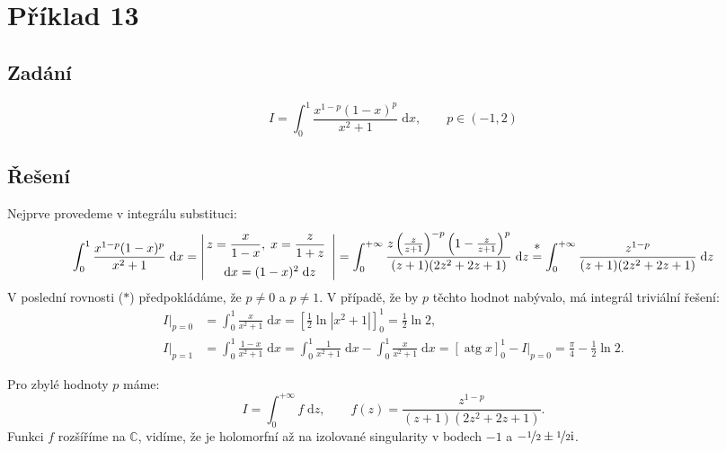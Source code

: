 \documentclass[10pt,a4paper]{article}
\newcommand{\const}[1]{\text{#1}}
\newcommand{\atg}{\operatorname{atg}}
\renewcommand{\d}[1]{\;\const{d}#1}
\renewcommand{\i}{\const{i}}
\begin{document}
\section{Příklad 13}
\subsection{Zadání}
\begin{equation*}
    I = \int_0^1 \frac{x^{1-p} (1-x)^p}{x^2+1} \d{x},
    \hspace{2em}
    p \in (-1, 2)
\end{equation*}

\subsection{Řešení}
Nejprve provedeme v integrálu substituci:
\begin{equation*}
    \int_0^1 \frac{x^{1-p} (1-x)^p}{x^2+1} \d{x}
    = \left| \begin{array}{c}
        \!\!z = \dfrac{x}{1-x}, \; x = \dfrac{z}{1+z} \\[10pt]
        \d{x} = (1-x)^2 \d{z}
    \end{array} \right|
    = \int_0^{+\infty} \frac{z \left(\frac{z}{z+1}\right)^{-p} \left(1 - \frac{z}{z+1}\right)^p}{(z+1)(2z^2 + 2z + 1)} \d{z}
    \stackrel{\mathclap{\normalfont\mbox{*}}}{=}
    \int_0^{+\infty} \frac{z^{1-p}}{(z+1)(2z^2 + 2z + 1)} \d{z}
\end{equation*}
V poslední rovnosti ($*$) předpokládáme, že $p\neq0$ a $p\neq 1$. V případě, že by $p$ těchto hodnot nabývalo, má integrál triviální řešení:
\begin{align*}
    I|_{p=0} &= \int_0^1 \frac{x}{x^2 + 1} \d{x} = \left[ \frac{1}{2} \ln |x^2 + 1 | \right]_0^1 = \frac{1}{2} \ln 2,
    \\[5pt]
    I|_{p=1} &= \int_0^1 \frac{1-x}{x^2+1} \d{x} = \int_0^1 \frac{1}{x^2+1} \d{x} - \int_0^1 \frac{x}{x^2 + 1} \d{x} = \left[\atg x\right]_0^1 - I|_{p=0} = \frac{\pi}{4} - \frac{1}{2} \ln 2.
\end{align*}

Pro zbylé hodnoty $p$ máme:
\begin{equation*}
    I = \int_0^{+\infty} f \d{z},
    \hspace{2em}
    f(z) = \frac{z^{1-p}}{(z+1)(2z^2 + 2z + 1)}.
\end{equation*}
Funkci $f$ rozšíříme na $\mathbb{C}$, vidíme, že je holomorfní až na izolované singularity v bodech $-1$ a $-\nicefrac{1}{2} \pm \nicefrac{1}{2} \i$.
\end{document}
